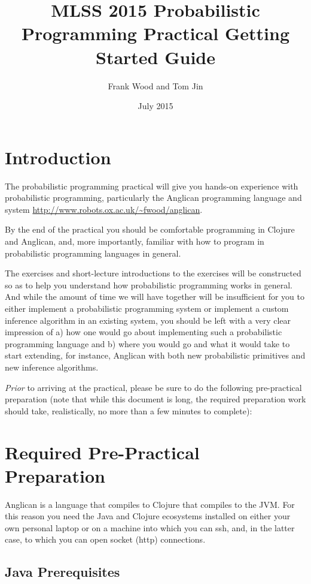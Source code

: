 \documentclass{article}
\title{MLSS 2015 Probabilistic Programming Practical Getting Started Guide}
\author{Frank Wood and Tom Jin}
\date{July 2015}
\begin{document}
\maketitle

\section{Introduction}
The probabilistic programming practical will give you hands-on experience
with probabilistic programming, particularly the Anglican programming language
and system \url{http://www.robots.ox.ac.uk/~fwood/anglican}.

By the end of the practical you should be comfortable programming in Clojure 
and Anglican, and, more importantly, familiar with how to program in probabilistic
programming languages in general.

The exercises and short-lecture introductions to the exercises will be constructed
so as to help you understand how probabilistic programming works in general.  And while the 
amount of time we will have together will be insufficient for you to either implement
a probabilistic programming system or implement a custom inference algorithm in
an existing system, you should be left with a very clear impression of a) how
one would go about implementing such a probabilistic programming language  and 
b) where you would go and what it would take to start
extending, for instance, Anglican with both new probabilistic primitives and 
new inference algorithms.

{\em Prior} to arriving at the practical, please be sure to do the following 
pre-practical preparation (note that while this document is long, the required
preparation work should take, realistically, no more than a few minutes to complete):

\section{Required Pre-Practical Preparation}

Anglican is a language that compiles to Clojure that compiles to the JVM.  For this reason
you need the Java and Clojure ecosystems installed on either your own personal laptop or on a 
machine into which you can ssh, and, in the latter case, to which you can open socket (http) connections.  

\subsection{Java Prerequisites}
\end{document}
